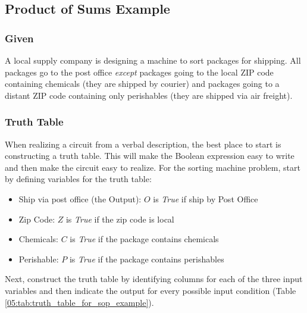 \subsection{Product of Sums Example}
\label{05:subsubsec:product_of_sums_example}

\subsubsection{Given}
\label{05:subsubsec:given_pos_example}

A local supply company is designing a machine to sort packages for shipping. All packages go to the post office \emph{except} packages going to the local ZIP code containing chemicals (they are shipped by courier) and packages going to a distant ZIP code containing only perishables (they are shipped via air freight).

\subsubsection{Truth Table}
\label{05:subsubsec:truth_table_pos_example}

When realizing a circuit from a verbal description, the best place to start is constructing a truth table. This will make the Boolean expression easy to write and then make the circuit easy to realize. For the sorting machine problem, start by defining variables for the truth table: 

\begin{itemize}
  \item Ship via post office (the Output):  $ O $ is \emph{True} if ship by Post Office
  \item Zip Code:  $ Z $ is \emph{True} if the zip code is local
  \item Chemicals:  $ C $ is \emph{True} if the package contains chemicals
  \item Perishable:  $ P $ is \emph{True} if the package contains perishables
\end{itemize}

Next, construct the truth table by identifying columns for each of the three input variables and then indicate the output for every possible input condition (Table \ref{05:tab:truth_table_for_sop_example}).

